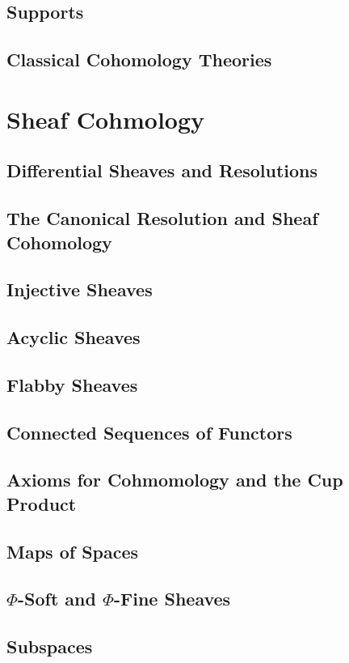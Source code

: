 \subsection{Supports}
\subsection{Classical Cohomology Theories}

\section{Sheaf Cohmology}
\subsection{Differential Sheaves and Resolutions}
\subsection{The Canonical Resolution and Sheaf Cohomology}
\subsection{Injective Sheaves}
\subsection{Acyclic Sheaves}
\subsection{Flabby Sheaves}
\subsection{Connected Sequences of Functors}
\subsection{Axioms for Cohmomology and the Cup Product}
\subsection{Maps of Spaces}
\subsection{$\Phi$-Soft and $\Phi$-Fine Sheaves}
\subsection{Subspaces}
